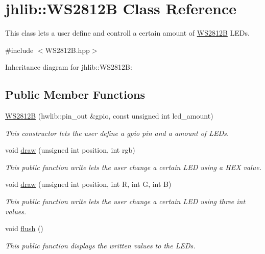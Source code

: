 \hypertarget{classjhlib_1_1WS2812B}{}\section{jhlib\+:\+:W\+S2812B Class Reference}
\label{classjhlib_1_1WS2812B}


This class lets a user define and controll a certain amount of \hyperlink{classjhlib_1_1WS2812B}{W\+S2812B} L\+E\+Ds.  




{\ttfamily \#include $<$W\+S2812\+B.\+hpp$>$}



Inheritance diagram for jhlib\+:\+:W\+S2812B\+:
\subsection*{Public Member Functions}
\begin{DoxyCompactItemize}
\item 
\hyperlink{classjhlib_1_1WS2812B_a421968f5ea0be36b24a1187da4b858db}{W\+S2812B} (hwlib\+::pin\+\_\+out \&gpio, const unsigned int led\+\_\+amount)
\begin{DoxyCompactList}\small\item\em This constructor lets the user define a gpio pin and a amount of L\+E\+Ds. \end{DoxyCompactList}\item 
void \hyperlink{classjhlib_1_1WS2812B_a1ee14275e07d0fcd6e19034df0518385}{draw} (unsigned int position, int rgb)
\begin{DoxyCompactList}\small\item\em This public function write lets the user change a certain L\+ED using a H\+EX value. \end{DoxyCompactList}\item 
void \hyperlink{classjhlib_1_1WS2812B_acc0da0a0477c66d665ae9a8cf78c0a8d}{draw} (unsigned int position, int R, int G, int B)
\begin{DoxyCompactList}\small\item\em This public function write lets the user change a certain L\+ED using three int values. \end{DoxyCompactList}\item 
void \hyperlink{classjhlib_1_1WS2812B_ac7a20c6eadaafa1449bada58669bc7c6}{flush} ()
\begin{DoxyCompactList}\small\item\em This public function displays the written values to the L\+E\+Ds. \end{DoxyCompactList}\end{DoxyCompactItemize}


